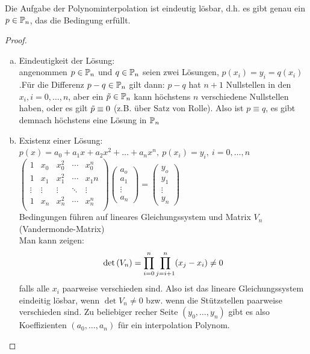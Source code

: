 \begin{theorem}
    Die Aufgabe der Polynominterpolation ist eindeutig lösbar, d.h. es gibt genau ein $p\in\mathbb{P}_n$,
    das die Bedingung erfüllt.    
\end{theorem}
\begin{proof}\hfill\\
\begin{enumerate}[(a)]
    \item Eindeutigkeit der Lösung:\\ angenommen $p\in\mathbb{P}_n$ und $q\in\mathbb{P}_n$ seien zwei Lösungen, $p(x_i)=y_i = 
    q(x_i)$.\newline Für die Differenz $p-q\in\mathbb{P}_n$ gilt dann: \newline
    $p-q$ hat $n+1$ Nullstellen in den $x_i, i=0,\dots, n$, aber ein $\Tilde{p}\in \mathbb{P}_n$ kann höchstens $n$ verschiedene 
    Nullstellen haben, oder es gilt $\Tilde{p}\equiv 0$ (z.B. über Satz von Rolle). Also ist $p\equiv q$, es gibt demnach 
    höchstens eine Lösung in $\mathbb{P}_n$ 

    \item Existenz einer Lösung:\\
    $p(x)= a_0+a_1x+a_2x^2+\dots+a_nx^n,\ p(x_i)=y_i, \ i=0,\dots,n$\\
    $\begin{pmatrix}
    1 & x_0 & x_0^2 & \cdots & x_0^n \\
    1 & x_1 & x_1^2 & \cdots & x_1n \\
    \vdots & \vdots & \vdots & \ddots & \vdots \\
    1 & x_n & x_n^2 & \cdots & x_n^n \\
    \end{pmatrix}
    \begin{pmatrix}
        a_o \\
        a_1 \\
        \vdots \\
        a_n
    \end{pmatrix} 
    =
    \begin{pmatrix}
        y_o \\
        y_1 \\
        \vdots \\
        y_n
    \end{pmatrix}$\\
    Bedingungen führen auf lineares Gleichungssystem und Matrix $V_n$ (Vandermonde-Matrix)\\
    Man kann zeigen: $$\text{det}\left(V_n\right)=\displaystyle\prod^n_{i=0}\displaystyle\prod^n_{j=i+1} (x_j-x_i) \neq 0 $$falls alle $x_i$ paarweise verschieden 
    sind. Also ist das lineare Gleichungssystem eindeitig lösbar, wenn $\det{V_n}\neq 0$ bzw. wenn die Stützstellen paarweise verschieden sind. Zu beliebiger recher Seite 
    $(y_0,\dots,y_n)$ gibt es also Koeffizienten $(a_0,\dots,a_n)$ für ein interpolation Polynom.\\
\end{enumerate}
\end{proof}

